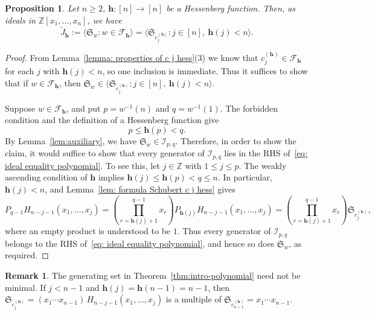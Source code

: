 \documentclass[11pt]{amsart}
\theoremstyle{plain}
\newtheorem{prop}[thm]{Proposition}
\theoremstyle{definition}
\newtheorem{rmk}[thm]{Remark}
\newcommand{\hess}{{\mathbf h}}
\newcommand{\Z}{\mathbb{ Z}}           %
\numberwithin{equation}{section}
\begin{document}
\begin{prop}\label{prop: theorem intro part 2}
Let $n\geq 2$, $\hess:[n]\to[n]$ be a Hessenberg function.   
Then, as ideals in $\mathbb{Z}[x_1,\ldots,x_n]$, we have 
\begin{equation}\label{eq: ideal equality polynomial}
\tilde{J}_\hess := \bigl\langle \mathfrak{S}_w : w\in\mathcal{F}_\hess \bigr\rangle
=
\bigl\langle \mathfrak{S}_{c_j^{(\hess)}} : j\in[n],\ \hess(j)<n \bigr\rangle.
\end{equation}
\end{prop} 




\begin{proof}
From Lemma~\ref{lemma: properties of c j hess}(3) we know that $c_j^{(\hess)}\in\mathcal{F}_\hess$ for each $j$ with $\hess(j)<n$, so one inclusion is immediate. Thus it suffices to show that if $w\in\mathcal{F}_\hess$, then $\mathfrak{S}_w\in\langle \mathfrak{S}_{c_j^{(\hess)}} : j\in[n],\ \hess(j)<n\rangle$.

Suppose $w\in\mathcal{F}_\hess$, and put $p=w^{-1}(n)$ and $q=w^{-1}(1)$. The forbidden condition and the definition of a Hessenberg function give
\[
p\leq\hess(p)<q.
\]
By Lemma~\ref{lem:auxiliary}, we have $\mathfrak{S}_w \in 
\mathcal{I}_{p,q}$. Therefore, in order to show the claim, it would suffice to show that every generator of $\mathcal{I}_{p,q}$ lies in the RHS of~\eqref{eq: ideal equality polynomial}.  
To see this, let $j \in \Z$ with $1\leq j\leq p$. The weakly ascending condition of $\hess$ implies $\hess(j)\leq\hess(p)<q\leq n$. In particular, $\hess(j)<n$, and Lemma~\ref{lem: formula Schubert c j hess} gives
\begin{equation*}
P_{q-1}H_{n-j-1}(x_1,\ldots,x_j)
=\left(\prod_{r=\hess(j)+1}^{q-1}x_r\right)
P_{\hess(j)}H_{n-j-1}(x_1,\ldots,x_j)
=\left(\prod_{r=\hess(j)+1}^{q-1}x_r\right)
\mathfrak{S}_{c_j^{(\hess)}},
\end{equation*}
where an empty product is understood to be $1$. Thus every generator of $\mathcal{I}_{p,q}$ belongs to the RHS of~\eqref{eq: ideal equality polynomial}, and hence so does $\mathfrak{S}_w$, as required. 
\end{proof}


\begin{rmk}\label{rmk: redundant generators}
The generating set in Theorem~\ref{thm:intro-polynomial} need not be minimal. If $j<n-1$ and $\hess(j)=\hess(n-1)=n-1$, then $\mathfrak{S}_{c_j^{(\hess)}}=(x_1\cdots x_{n-1})\,H_{n-j-1}(x_1,\ldots,x_j)$ is a multiple of $\mathfrak{S}_{c_{n-1}^{(\hess)}}=x_1\cdots x_{n-1}$. 
\end{rmk}
\end{document}
